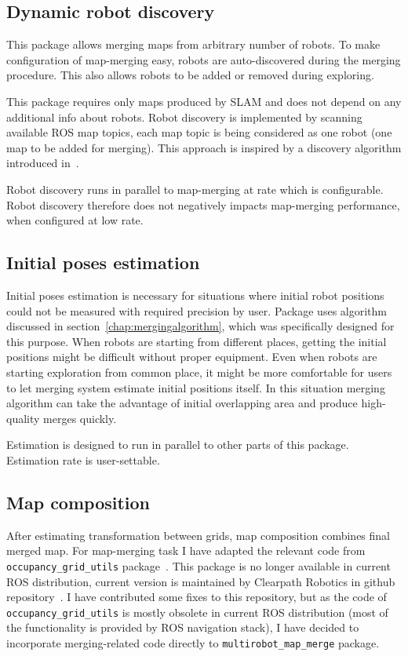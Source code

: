 \subsection{Dynamic robot discovery}

This package allows merging maps from arbitrary number of robots. To make configuration of map-merging easy, robots are auto-discovered during the merging procedure. This also allows robots to be added or removed during exploring.

This package requires only maps produced by \gls{SLAM} and does not depend on any additional info about robots. Robot discovery is implemented by scanning available \gls{ROS} map topics, each map topic is being considered as one robot (one map to be added for merging). This approach is inspired by a discovery algorithm introduced in~\cite{Yan2014}.

Robot discovery runs in parallel to map-merging at rate which is configurable. Robot discovery therefore does not negatively impacts map-merging performance, when configured at low rate.

\subsection{Initial poses estimation}

Initial poses estimation is necessary for situations where initial robot positions could not be measured with required precision by user. Package uses algorithm discussed in section~\ref{chap:mergingalgorithm}, which was specifically designed for this purpose. When robots are starting from different places, getting the initial positions might be difficult without proper equipment. Even when robots are starting exploration from common place, it might be more comfortable for users to let merging system estimate initial positions itself. In this situation merging algorithm can take the advantage of initial overlapping area and produce high-quality merges quickly.

Estimation is designed to run in parallel to other parts of this package. Estimation rate is user-settable.

\subsection{Map composition}
\label{sec:map-composition}

After estimating transformation between grids, map composition combines final merged map. For map-merging task I have adapted the relevant code from \texttt{occu\-pan\-cy\_grid\_uti\-ls} package~\cite{Marthi2014}. This package is no longer available in current \gls{ROS} distribution, current version is maintained by Clearpath Robotics in github repository~\cite{GitHubOccGridUtils}. I have contributed some fixes to this repository, but as the code of \texttt{occu\-pan\-cy\_grid\_uti\-ls} is mostly obsolete in current \gls{ROS} distribution (most of the functionality is provided by \gls{ROS} navigation stack), I have decided to incorporate merging-related code directly to \texttt{multi\-robot\_map\_merge} package.

